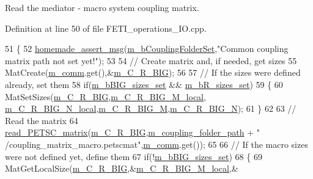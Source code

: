 Read the mediator -\/ macro system coupling matrix. 



Definition at line 50 of file F\+E\+T\+I\+\_\+operations\+\_\+\+I\+O.\+cpp.


\begin{DoxyCode}
51 \{
52     \hyperlink{common__header_8h_a593ccc80b790b2268653fcf6597bf451}{homemade\_assert\_msg}(\hyperlink{classcarl_1_1_f_e_t_i___operations_a99e19ecbfadee9c10545ba8ca0682f33}{m\_bCouplingFolderSet},\textcolor{stringliteral}{"Common coupling matrix
       path not set yet!"});
53 
54     \textcolor{comment}{// Create matrix and, if needed, get sizes}
55     MatCreate(\hyperlink{classcarl_1_1_f_e_t_i___operations_a8cb0ed286667fc9f3ebc2d8ef2a3e13b}{m\_comm}.get(),&\hyperlink{classcarl_1_1_f_e_t_i___operations_a397d6a5e3e4111e06bb1ec52abdc6fa8}{m\_C\_R\_BIG});
56     
57     \textcolor{comment}{// If the sizes were defined already, set them}
58     \textcolor{keywordflow}{if}(\hyperlink{classcarl_1_1_f_e_t_i___operations_a03d5022fa7da0e04b60c59c3d3cd598a}{m\_bBIG\_sizes\_set} && \hyperlink{classcarl_1_1_f_e_t_i___operations_a353b1739899d3d0260b97132603dbe02}{m\_bR\_sizes\_set})
59     \{
60         MatSetSizes(\hyperlink{classcarl_1_1_f_e_t_i___operations_a397d6a5e3e4111e06bb1ec52abdc6fa8}{m\_C\_R\_BIG},\hyperlink{classcarl_1_1_f_e_t_i___operations_adb43af921deb83b507b3af27d7ac2e1f}{m\_C\_R\_BIG\_M\_local},
      \hyperlink{classcarl_1_1_f_e_t_i___operations_a87856fb17203f71c386d800b1021e483}{m\_C\_R\_BIG\_N\_local},\hyperlink{classcarl_1_1_f_e_t_i___operations_a8c26f1927c4b8825fe96ddfa51410c56}{m\_C\_R\_BIG\_M},\hyperlink{classcarl_1_1_f_e_t_i___operations_a70409f475e309e5fbcea9be931aa321b}{m\_C\_R\_BIG\_N});
61     \}
62 
63     \textcolor{comment}{// Read the matrix}
64     \hyperlink{namespacecarl_ac9086ba3b6072efdbafaaa5ae53927de}{read\_PETSC\_matrix}(\hyperlink{classcarl_1_1_f_e_t_i___operations_a397d6a5e3e4111e06bb1ec52abdc6fa8}{m\_C\_R\_BIG},\hyperlink{classcarl_1_1_f_e_t_i___operations_a2eee572375e0b5aab15f31fb55f2e48f}{m\_coupling\_folder\_path} + \textcolor{stringliteral}{"
      /coupling\_matrix\_macro.petscmat"},\hyperlink{classcarl_1_1_f_e_t_i___operations_a8cb0ed286667fc9f3ebc2d8ef2a3e13b}{m\_comm}.get());
65 
66     \textcolor{comment}{// If the macro sizes were not defined yet, define them }
67     \textcolor{keywordflow}{if}(!\hyperlink{classcarl_1_1_f_e_t_i___operations_a03d5022fa7da0e04b60c59c3d3cd598a}{m\_bBIG\_sizes\_set})
68     \{
69         MatGetLocalSize(\hyperlink{classcarl_1_1_f_e_t_i___operations_a397d6a5e3e4111e06bb1ec52abdc6fa8}{m\_C\_R\_BIG},&\hyperlink{classcarl_1_1_f_e_t_i___operations_adb43af921deb83b507b3af27d7ac2e1f}{m\_C\_R\_BIG\_M\_local},&

\end{DoxyCode}
